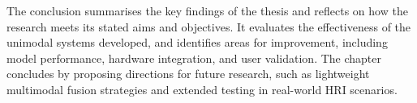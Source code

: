 The conclusion summarises the key findings of the thesis and reflects on how the research meets its stated aims and objectives. It evaluates the effectiveness of the unimodal systems developed, and identifies areas for improvement, including model performance, hardware integration, and user validation. The chapter concludes by proposing directions for future research, such as lightweight multimodal fusion strategies and extended testing in real-world HRI scenarios.